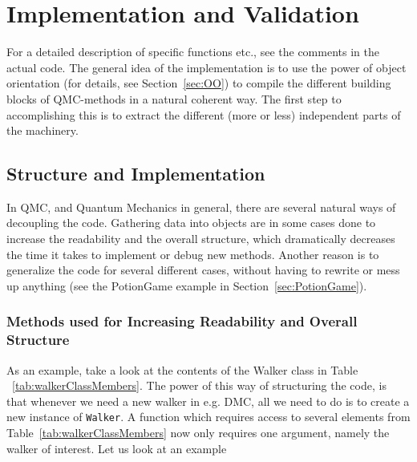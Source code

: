 \chapter{Implementation and Validation}

For a detailed description of specific functions etc., see the comments in the actual code. The general idea of the implementation is to use the power of object orientation (for details, see Section~\ref{sec:OO}) to compile the different building blocks of QMC-methods in a natural coherent way. The first step to accomplishing this is to extract the different (more or less) independent parts of the machinery.

\section{Structure and Implementation}
\label{sec:StructureandImplementation}

In QMC, and Quantum Mechanics in general, there are several natural ways of decoupling the code. Gathering data into objects are in some cases done to increase the readability and the overall structure, which dramatically decreases the time it takes to implement or debug new methods. Another reason is to generalize the code for several different cases, without having to rewrite or mess up anything (see the PotionGame example in Section~\ref{sec:PotionGame}).

\subsection{Methods used for Increasing Readability and Overall Structure}

As an example, take a look at the contents of the Walker class in Table ~\ref{tab:walkerClassMembers}. The power of this way of structuring the code, is that whenever we need a new walker in e.g. DMC, all we need to do is to create a new instance of \verb+Walker+. A function which requires access to several elements from Table~\ref{tab:walkerClassMembers} now only requires one argument, namely the walker of interest. Let us look at an example

